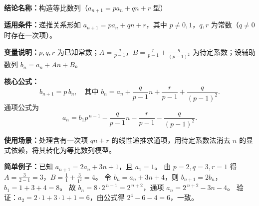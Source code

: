 \textbf{结论名称：}构造等比数列（\(a_{n+1}=pa_n+q n+r\) 型）

\textbf{适用条件：}递推关系形如 \(a_{n+1}=p a_n+q n+r\)，其中 \(p\neq0,1\)，\(q,r\) 为常数（\(q\neq0\) 时存在一次项）。

\textbf{变量说明：}\(p,q,r\) 为已知常数；\(A=\frac{q}{p-1}\)，\(B=\frac{r}{p-1}+\frac{q}{(p-1)^2}\) 为待定系数；设辅助数列 \(b_n=a_n+A n+B\)。

\textbf{核心公式：}
\[
\boxed{b_{n+1}=p\,b_n},\quad \text{其中 } b_n=a_n+\frac{q}{p-1}n+\frac{r}{p-1}+\frac{q}{(p-1)^2}.
\]
通项公式为
\[
a_n=b_1 p^{\,n-1}-\frac{q}{p-1}n-\frac{r}{p-1}-\frac{q}{(p-1)^2}.
\]

\textbf{使用场景：}处理含有一次项 \(q n+r\) 的线性递推求通项，用待定系数法消去 \(n\) 的显式依赖，将其转化为等比数列模型。

\textbf{简单例子：}已知 \(a_{n+1}=2a_n+3n+1\)，且 \(a_1=1\)。  
由 \(p=2,q=3,r=1\) 得 \(A=\frac{3}{2-1}=3\)，\(B=\frac{1}{1}+\frac{3}{1^2}=4\)。  
令 \(b_n=a_n+3n+4\)，则 \(b_{n+1}=2b_n\)，\(b_1=1+3+4=8\)。  
故 \(b_n=8\cdot2^{\,n-1}=2^{\,n+2}\)，通项 \(a_n=2^{\,n+2}-3n-4\)。  
验证：\(a_2=2\cdot1+3\cdot1+1=6\)，由公式得 \(2^4-6-4=6\)，一致。